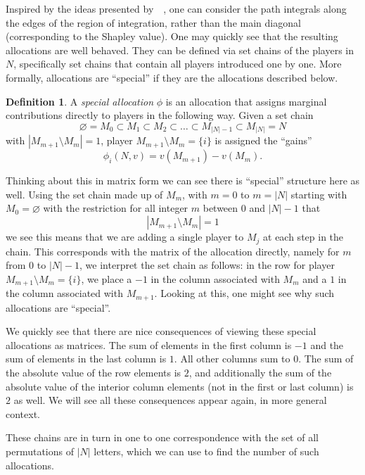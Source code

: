 \documentclass[12pt,letterpaper,final]{article}
\theoremstyle{plain}
\theoremstyle{plain}
\theoremstyle{plain}
\theoremstyle{plain}
\theoremstyle{plain}
\theoremstyle{plain}
\theoremstyle{plain}
\theoremstyle{definition}
\newtheorem{definition}{Definition}[section]
\theoremstyle{definition}
\theoremstyle{definition}
\theoremstyle{definition}
\theoremstyle{definition}
\theoremstyle{remark}
\theoremstyle{remark}
\theoremstyle{remark}
\theoremstyle{remark}
\begin{document}
Inspired by the ideas presented by~\citeauthor{Owen72}~\cite{Owen72},
one can consider the path integrals along the edges of the region of
integration, rather than the main diagonal (corresponding to the
Shapley value). One may quickly see that the resulting allocations are
well behaved. They can be defined via set chains of the
players in \(N\), specifically set chains that contain all players
introduced one by one.  More formally, allocations are ``special'' if
they are the allocations described below.
\begin{definition}
  A \emph{special allocation} \(\phi\) is an allocation that
  assigns marginal contributions directly to players in the following
  way. Given a set chain
  \[
    \varnothing = M_0 \subset M_1 \subset M_2\subset \ldots \subset
    M_{|N|-1} \subset M_{|N|}=N
  \]
  with \(\left|M_{m+1}\setminus M_m\right| = 1\), player
  \(M_{m+1}\setminus M_m = \{i\}\) is assigned the ``gains''
  \[
    \phi_{i}(N,v) = v(M_{m+1}) - v(M_m).
  \]
\end{definition}

Thinking about this in matrix form we can see there is
``special'' structure here as well. Using the set chain
made up of \(M_m\), with \(m=0\) to \(m=|N|\) starting with
\(M_0=\varnothing\) with the restriction for all integer \(m\) between
\(0\) and \(\left|N\right|-1\) that
\[
  \left|M_{m+1}\setminus M_m\right| = 1
\]
we see this means that we are adding a single player to \(M_j\) at
each step in the chain. This corresponds with the matrix of the
allocation directly, namely for \(m\) from \(0\) to
\(\left|N\right|-1\), we interpret the set chain as follows: in the
row for player \(M_{m+1}\setminus M_m =\{i\}\), we place a \(-1\) in
the column associated with \(M_m\) and a \(1\) in the column
associated with \(M_{m+1}\). Looking at this, one might see why such
allocations are ``special''.

We quickly see that there are nice consequences of viewing these
special allocations as matrices.
The sum of elements in the first column is \(-1\) and the sum of
elements in the last column is \(1\). All other columns sum to
\(0\). The sum of the absolute value of the row elements is \(2\), and
additionally the sum of the absolute value of the interior column
elements (not in the first or last column) is \(2\)
as well. We will see all these consequences appear again, in more
general context.

These chains are in turn in one to one correspondence with the set of
all permutations of \(|N|\) letters, which we can use to find the
number of such allocations.
\end{document}
